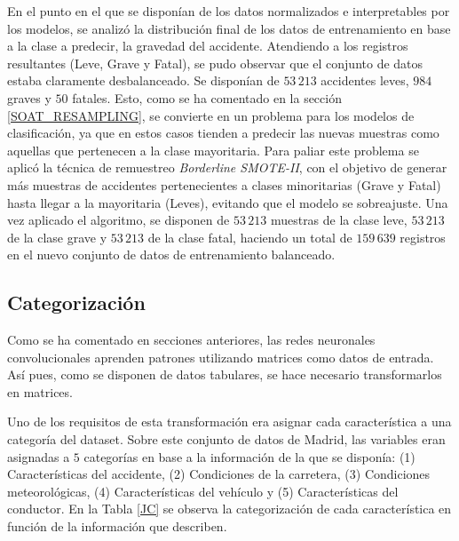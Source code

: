 En el punto en el que se disponían de los datos normalizados e interpretables por los modelos, se analizó la distribución final de los datos de entrenamiento en base a la clase a predecir, la gravedad del accidente. Atendiendo a los registros resultantes (Leve, Grave y Fatal), se pudo observar que el conjunto de datos estaba claramente desbalanceado. Se disponían de $53\,213$ accidentes leves, $984$ graves y $50$ fatales. Esto, como se ha comentado en la sección \ref{SOAT_RESAMPLING}, se convierte en un problema para los modelos de clasificación, ya que en estos casos tienden a predecir las nuevas muestras como aquellas que pertenecen a la clase mayoritaria. Para paliar este problema se aplicó la técnica de remuestreo \textit{Borderline SMOTE-II}, con el objetivo de generar más muestras de accidentes pertenecientes a clases minoritarias (Grave y Fatal) hasta llegar a la mayoritaria (Leves), evitando que el modelo se sobreajuste. Una vez aplicado el algoritmo, se disponen de $53\,213$ muestras de la clase leve, $53\,213$ de la clase grave y $53\,213$ de la clase fatal, haciendo un total de $159\,639$ registros en el nuevo conjunto de datos de entrenamiento balanceado.



\subsection*{Categorización}

Como se ha comentado en secciones anteriores, las redes neuronales convolucionales aprenden patrones utilizando matrices como datos de entrada. Así pues, como se disponen de datos tabulares, se hace necesario transformarlos en matrices.

Uno de los requisitos de esta transformación era asignar cada característica a una categoría del dataset. Sobre este conjunto de datos de Madrid, las variables eran asignadas a $5$ categorías en base a la información de la que se disponía: (1) Características del accidente, (2) Condiciones de la carretera, (3) Condiciones meteorológicas, (4) Características del vehículo y (5) Características del conductor. En la Tabla \ref{JC} se observa la categorización de cada característica en función de la información que describen.


